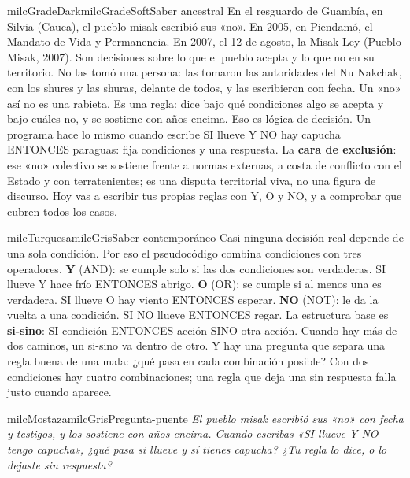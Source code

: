 \documentclass[11pt,letterpaper]{article}
\begin{document}
\begin{softbox}{milcGradeDark}{milcGradeSoft}{Saber ancestral}
En el resguardo de Guambía, en Silvia (Cauca), el pueblo misak escribió sus «no». En 2005, en Piendamó, el Mandato de Vida y Permanencia. En 2007, el 12 de agosto, la Misak Ley (Pueblo Misak, 2007). Son decisiones sobre lo que el pueblo acepta y lo que no en su territorio. No las tomó una persona: las tomaron las autoridades del Nu Nakchak, con los shures y las shuras, delante de todos, y las escribieron con fecha. Un «no» así no es una rabieta. Es una regla: dice bajo qué condiciones algo se acepta y bajo cuáles no, y se sostiene con años encima. Eso es lógica de decisión. Un programa hace lo mismo cuando escribe SI llueve Y NO hay capucha ENTONCES paraguas: fija condiciones y una respuesta. La \textbf{cara de exclusión}: ese «no» colectivo se sostiene frente a normas externas, a costa de conflicto con el Estado y con terratenientes; es una disputa territorial viva, no una figura de discurso. Hoy vas a escribir tus propias reglas con Y, O y NO, y a comprobar que cubren todos los casos.\par{}
\end{softbox}

\begin{softbox}{milcTurquesa}{milcGris}{Saber contemporáneo}
Casi ninguna decisión real depende de una sola condición. Por eso el pseudocódigo combina condiciones con tres operadores. \textbf{Y} (AND): se cumple solo si las dos condiciones son verdaderas. SI llueve Y hace frío ENTONCES abrigo. \textbf{O} (OR): se cumple si al menos una es verdadera. SI llueve O hay viento ENTONCES esperar. \textbf{NO} (NOT): le da la vuelta a una condición. SI NO llueve ENTONCES regar. La estructura base es \textbf{si-sino}: SI condición ENTONCES acción SINO otra acción. Cuando hay más de dos caminos, un si-sino va dentro de otro. Y hay una pregunta que separa una regla buena de una mala: ¿qué pasa en cada combinación posible? Con dos condiciones hay cuatro combinaciones; una regla que deja una sin respuesta falla justo cuando aparece.
\end{softbox}

\begin{softbox}{milcMostaza}{milcGris}{Pregunta-puente}
\textit{El pueblo misak escribió sus «no» con fecha y testigos, y los sostiene con años encima. Cuando escribas «SI llueve Y NO tengo capucha», ¿qué pasa si llueve y sí tienes capucha? ¿Tu regla lo dice, o lo dejaste sin respuesta?}
\end{softbox}
\end{document}
